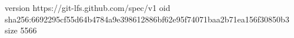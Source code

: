 version https://git-lfs.github.com/spec/v1
oid sha256:6692295cf55d64b4784a9e398612886bf62e95f74071baa2b71ea156f30850b3
size 5566

